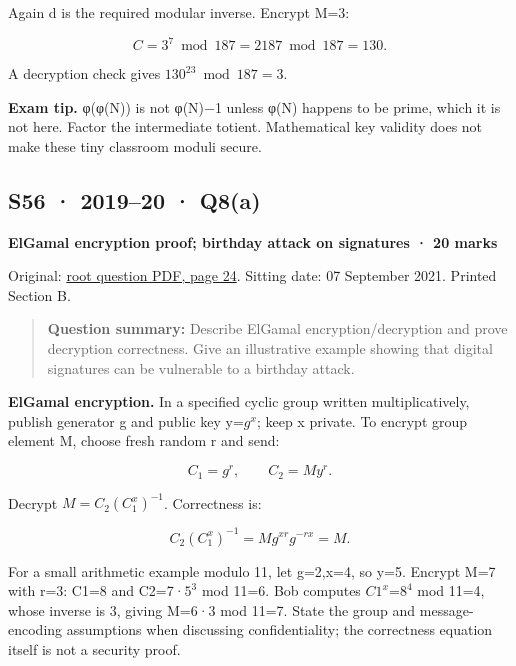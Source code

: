 \documentclass[11pt,a4paper]{article}
\begin{document}
Again d is the required modular inverse. Encrypt M=\allowbreak{}3:



\[
C=3^7\bmod187=2187\bmod187=130.
\]

A decryption check gives \(130^{23}\bmod187=3\).



{\color{ForestGreen}\textbf{Exam tip.} φ(φ(N)) is not φ(N)−1 unless φ(N) happens to be prime,\allowbreak{} which it is not here. Factor the intermediate totient. Mathematical key validity does not make these tiny classroom moduli secure.}




\clearpage
\subsection{S56 · 2019–20 · Q8(a)}\label{s56}

\textbf{ElGamal encryption proof; birthday attack on signatures · 20 marks}


Original: \href{../../CSE405-Security_Merged.pdf\#page=24}{root question PDF,\allowbreak{} page 24}. Sitting date: 07 September 2021. Printed Section B.



\begin{quote}\small

\textbf{Question summary:} Describe ElGamal encryption/\allowbreak{}decryption and prove decryption correctness. Give an illustrative example showing that digital signatures can be vulnerable to a birthday attack.



\end{quote}

\textbf{ElGamal encryption.} In a specified cyclic group written multiplicatively,\allowbreak{} publish generator g and public key y=\allowbreak{}\(g^{x}\); keep x private. To encrypt group element M,\allowbreak{} choose fresh random r and send:



\[
C_1=g^r,\qquad C_2=My^r.
\]

Decrypt \(M=C_2(C_1^x)^{-1}\). Correctness is:



\[
C_2(C_1^x)^{-1}=Mg^{xr}g^{-rx}=M.
\]

For a small arithmetic example modulo 11,\allowbreak{} let g=\allowbreak{}2,\allowbreak{}x=\allowbreak{}4,\allowbreak{} so y=\allowbreak{}5. Encrypt M=\allowbreak{}7 with r=\allowbreak{}3: C1=\allowbreak{}8 and C2=\allowbreak{}7·\(5^{3}\) mod 11=\allowbreak{}6. Bob computes \(C1^{x}\)=\allowbreak{}\(8^{4}\) mod 11=\allowbreak{}4,\allowbreak{} whose inverse is 3,\allowbreak{} giving M=\allowbreak{}6·3 mod 11=\allowbreak{}7. State the group and message-encoding assumptions when discussing confidentiality; the correctness equation itself is not a security proof.
\end{document}
